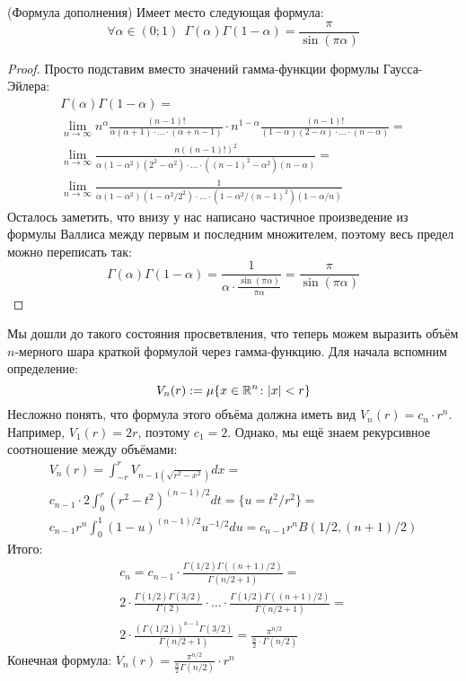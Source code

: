 \begin{theorem} (Формула дополнения)
	Имеет место следующая формула:
	\[
		\forall \alpha \in (0; 1)\ \ \Gamma(\alpha)\Gamma(1 - \alpha) = \frac{\pi}{\sin(\pi \alpha)}
	\]
\end{theorem}

\begin{proof}
	Просто подставим вместо значений гамма-функции формулы Гаусса-Эйлера:
	\begin{multline*}
		\Gamma(\alpha)\Gamma(1 - \alpha) =
		\\
		\lim_{n \to \infty} n^\alpha \frac{(n - 1)!}{\alpha(\alpha + 1) \cdot \ldots \cdot (\alpha + n - 1)} \cdot n^{1 - \alpha} \frac{(n - 1)!}{(1 - \alpha)(2 - \alpha) \cdot \ldots \cdot (n - \alpha)} =
		\\
		\lim_{n \to \infty} \frac{n((n - 1)!)^2}{\alpha(1 - \alpha^2)(2^2 - \alpha^2) \cdot \ldots \cdot ((n - 1)^2 - \alpha^2)(n - \alpha)} =
		\\
		\lim_{n \to \infty} \frac{1}{\alpha(1 - \alpha^2)(1 - \alpha^2 / 2^2) \cdot \ldots \cdot (1 - \alpha^2 / (n - 1)^2)(1 - \alpha / n)}
	\end{multline*}
	Осталось заметить, что внизу у нас написано частичное произведение из формулы Валлиса между первым и последним множителем, поэтому весь предел можно переписать так:
	\[
		\Gamma(\alpha)\Gamma(1 - \alpha) = \frac{1}{\alpha \cdot \frac{\sin(\pi\alpha)}{\pi\alpha}} = \frac{\pi}{\sin(\pi\alpha)}
	\]
\end{proof}

\begin{example}
	Мы дошли до такого состояния просветвления, что теперь можем выразить объём $n$-мерного шара краткой формулой через гамма-функцию. Для начала вспомним определение:
	\[
		V_n(r) := \mu\{x \in \mathbb{R}^n \colon |x| < r\}
	\]
	Несложно понять, что формула этого объёма должна иметь вид $V_n(r) = c_n \cdot r^n$. Например, $V_1(r) = 2r$, поэтому $c_1 = 2$. Однако, мы ещё знаем рекурсивное соотношение между объёмами:
	\begin{multline*}
		V_n(r) = \int_{-r}^r V_{n - 1(\sqrt{r^2 - x^2})}dx =
		\\
		c_{n - 1} \cdot 2\int_0^r (r^2 - t^2)^{(n - 1) / 2}dt = \{u = t^2 / r^2\} =
		\\
		c_{n - 1} r^n \int_0^1 (1 - u)^{(n - 1) / 2} u^{-1 / 2}du = c_{n - 1} r^n B(1 / 2, (n + 1) / 2)
	\end{multline*}
	Итого:
	\begin{multline*}
		c_n = c_{n - 1} \cdot \frac{\Gamma(1 / 2)\Gamma((n + 1) / 2)}{\Gamma(n / 2 + 1)} =
		\\
		2 \cdot \frac{\Gamma(1 / 2)\Gamma(3 / 2)}{\Gamma(2)} \cdot \ldots \cdot \frac{\Gamma(1 / 2)\Gamma((n + 1) / 2)}{\Gamma(n / 2 + 1)} =
		\\
		2 \cdot \frac{(\Gamma(1 / 2))^{n - 1}\Gamma(3 / 2)}{\Gamma(n / 2 + 1)} = \frac{\pi^{n / 2}}{\frac{n}{2} \cdot \Gamma(n / 2)}
	\end{multline*}
	Конечная формула: $V_n(r) = \frac{\pi^{n / 2}}{\frac{n}{2}\Gamma(n / 2)} \cdot r^n$
\end{example}

